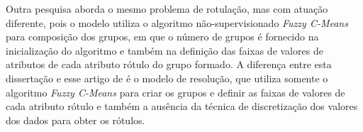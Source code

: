 Outra pesquisa \cite{Filho2015}  aborda o mesmo problema de rotulação, mas com atuação diferente, pois o modelo utiliza o algoritmo não-supervisionado \textit{Fuzzy C-Means} para composição dos grupos, em que o número de grupos é fornecido na inicialização do algoritmo e também na definição das faixas de valores de atributos de cada atributo rótulo do grupo formado. A diferença entre esta dissertação e esse artigo de  é o modelo de resolução, que utiliza somente o algoritmo \textit{Fuzzy C-Means} para criar os grupos e definir as faixas de valores de cada atributo rótulo e também a ausência da técnica de discretização dos valores dos dados para obter os rótulos.






